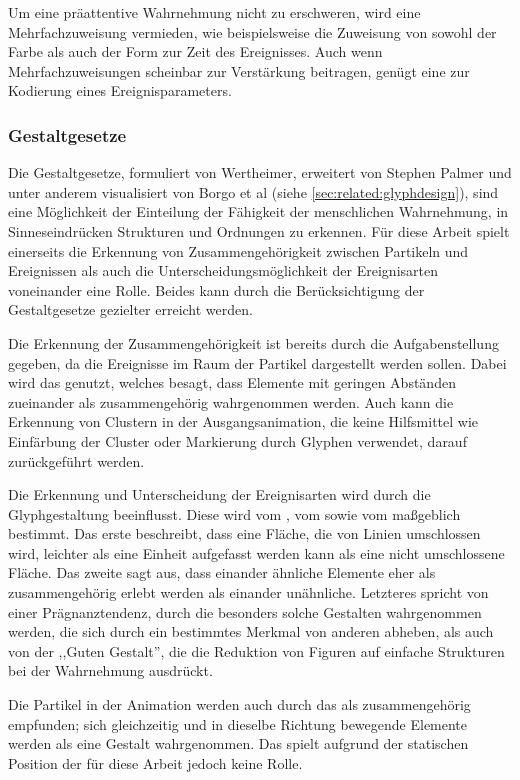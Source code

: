 Um eine präattentive Wahrnehmung nicht zu erschweren, wird eine Mehrfachzuweisung vermieden, wie beispielsweise die Zuweisung von sowohl der Farbe als auch der Form zur Zeit des Ereignisses. Auch wenn Mehrfachzuweisungen scheinbar zur Verstärkung beitragen, genügt eine  zur Kodierung eines Ereignisparameters.

\subsubsection{Gestaltgesetze}\label{sec:grundlagen:gestaltgesetze}
Die Gestaltgesetze, formuliert von Wertheimer, erweitert von Stephen Palmer und unter anderem visualisiert von Borgo et al (siehe \autoref{sec:related:glyphdesign}), sind eine Möglichkeit der Einteilung der Fähigkeit der menschlichen Wahrnehmung, in Sinneseindrücken Strukturen und Ordnungen zu erkennen. Für diese Arbeit spielt einerseits die Erkennung von Zusammengehörigkeit zwischen Partikeln und Ereignissen als auch die Unterscheidungsmöglichkeit der Ereignisarten voneinander eine Rolle. Beides kann durch die Berücksichtigung der Gestaltgesetze gezielter erreicht werden.

Die Erkennung der Zusammengehörigkeit ist bereits durch die Aufgabenstellung gegeben, da die Ereignisse im Raum der Partikel dargestellt werden sollen. Dabei wird das  genutzt, welches besagt, dass Elemente mit geringen Abständen zueinander als zusammengehörig wahrgenommen werden. Auch kann die Erkennung von Clustern in der Ausgangsanimation, die keine Hilfsmittel wie Einfärbung der Cluster oder Markierung durch Glyphen verwendet, darauf zurückgeführt werden.

Die Erkennung und Unterscheidung der Ereignisarten wird durch die Glyphgestaltung beeinflusst. Diese wird vom , vom  sowie vom  maßgeblich bestimmt. Das erste beschreibt, dass eine Fläche, die von Linien umschlossen wird, leichter als eine Einheit aufgefasst werden kann als eine nicht umschlossene Fläche. Das zweite sagt aus, dass einander ähnliche Elemente eher als zusammengehörig erlebt werden als einander unähnliche. Letzteres spricht von einer Prägnanztendenz, durch die besonders solche Gestalten wahrgenommen werden, die sich durch ein bestimmtes Merkmal von anderen abheben, als auch von der ,,Guten Gestalt'', die die Reduktion von Figuren auf einfache Strukturen bei der Wahrnehmung ausdrückt.

Die Partikel in der Animation werden auch durch das  als zusammengehörig empfunden; sich gleichzeitig und in dieselbe Richtung bewegende Elemente werden als eine Gestalt wahrgenommen. Das spielt aufgrund der statischen Position der  für diese Arbeit jedoch keine Rolle.


